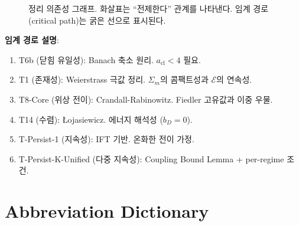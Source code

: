 \begin{figure}[p]
\centering
{}
\caption{정리 의존성 그래프. 화살표는 ``전제한다'' 관계를 나타낸다. 임계 경로(critical path)는 굵은 선으로 표시된다.}
\label{fig:theorem-dag}
\end{figure}

\textbf{임계 경로 설명}:
\begin{enumerate}
    \item T6b (닫힘 유일성): Banach 축소 원리. $a_{\mathrm{cl}} < 4$ 필요.
    \item T1 (존재성): Weierstrass 극값 정리. $\Sigma_m$의 콤팩트성과 $\mathcal{E}$의 연속성.
    \item T8-Core (위상 전이): Crandall-Rabinowitz. Fiedler 고유값과 이중 우물.
    \item T14 (수렴): Łojasiewicz. 에너지 해석성 ($b_D = 0$).
    \item T-Persist-1 (지속성): IFT 기반. 온화한 전이 가정.
    \item T-Persist-K-Unified (다중 지속성): Coupling Bound Lemma + per-regime 조건.
\end{enumerate}


\section{Abbreviation Dictionary}
\label{app:abbreviations}

